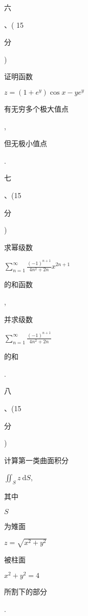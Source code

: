 \documentclass[10pt]{article}
\begin{document}
\begin{CJK}{UTF8}{mj}六\end{CJK}、( 15 \begin{CJK}{UTF8}{mj}分\end{CJK}) \begin{CJK}{UTF8}{mj}证明函数\end{CJK} $z=\left(1+e^{y}\right) \cos x-y e^{y}$ \begin{CJK}{UTF8}{mj}有无穷多个极大值点\end{CJK}, \begin{CJK}{UTF8}{mj}但无极小值点\end{CJK}.

\begin{CJK}{UTF8}{mj}七\end{CJK}、(15 \begin{CJK}{UTF8}{mj}分\end{CJK}) \begin{CJK}{UTF8}{mj}求幂级数\end{CJK} $\sum_{n=1}^{\infty} \frac{(-1)^{n+1}}{4 n^{2}+2 n} x^{2 n+1}$ \begin{CJK}{UTF8}{mj}的和函数\end{CJK}, \begin{CJK}{UTF8}{mj}并求级数\end{CJK} $\sum_{n=1}^{\infty} \frac{(-1)^{n+1}}{4 n^{2}+2 n}$ \begin{CJK}{UTF8}{mj}的和\end{CJK}.

\begin{CJK}{UTF8}{mj}八\end{CJK}、(15 \begin{CJK}{UTF8}{mj}分\end{CJK}) \begin{CJK}{UTF8}{mj}计算第一类曲面积分\end{CJK} $\iint_{S} z \mathrm{~d} S$, \begin{CJK}{UTF8}{mj}其中\end{CJK} $S$ \begin{CJK}{UTF8}{mj}为雉面\end{CJK} $z=\sqrt{x^{2}+y^{2}}$ \begin{CJK}{UTF8}{mj}被柱面\end{CJK} $x^{2}+y^{2}=4$ \begin{CJK}{UTF8}{mj}所割下的部分\end{CJK}.
\end{document}
